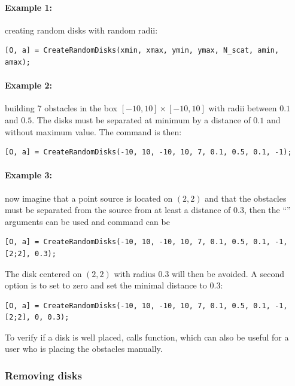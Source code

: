 \paragraph{Example 1:} creating  random disks with random radii:
\begin{lstlisting}
[O, a] = CreateRandomDisks(xmin, xmax, ymin, ymax, N_scat, amin, amax);
\end{lstlisting}
\paragraph{Example 2:} building 7 obstacles in the box $[-10,10]\times[-10,10]$ with radii between $0.1$ and $0.5$. The disks must be separated at minimum by a distance of $0.1$ and without maximum value. The command is then:
\begin{lstlisting}
[O, a] = CreateRandomDisks(-10, 10, -10, 10, 7, 0.1, 0.5, 0.1, -1);
\end{lstlisting}
\paragraph{Example 3:} now imagine that a point source is located on $(2,2)$ and that the obstacles must be separated from the source from at least a distance of $0.3$, then the ``'' arguments can be used and command can be
\begin{lstlisting}
[O, a] = CreateRandomDisks(-10, 10, -10, 10, 7, 0.1, 0.5, 0.1, -1, [2;2], 0.3);
\end{lstlisting}
The disk centered on $(2,2)$ with radius $0.3$ will then be avoided. A second option is to set  to zero and set the minimal distance  to $0.3$:
\begin{lstlisting}
[O, a] = CreateRandomDisks(-10, 10, -10, 10, 7, 0.1, 0.5, 0.1, -1, [2;2], 0, 0.3);
\end{lstlisting}


\begin{remark}
To verify if a disk is well placed,  calls  function, which can also be useful for a user who is placing the obstacles manually.
\end{remark}

\subsubsection{Removing disks}


